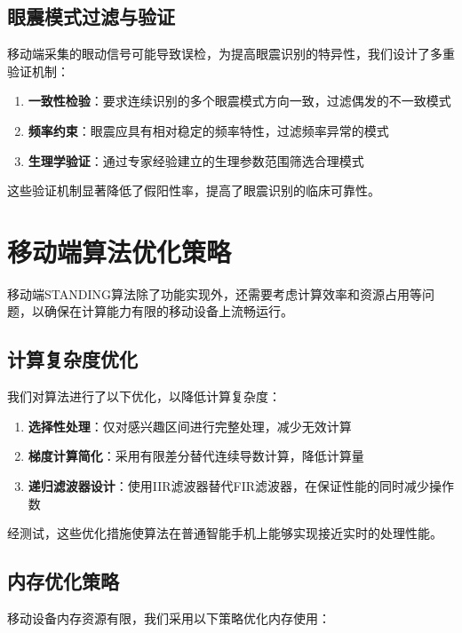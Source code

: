 \subsection{眼震模式过滤与验证}

移动端采集的眼动信号可能导致误检，为提高眼震识别的特异性，我们设计了多重验证机制：

\begin{enumerate}
  \item \textbf{一致性检验}：要求连续识别的多个眼震模式方向一致，过滤偶发的不一致模式
  \item \textbf{频率约束}：眼震应具有相对稳定的频率特性，过滤频率异常的模式
  \item \textbf{生理学验证}：通过专家经验建立的生理参数范围筛选合理模式
\end{enumerate}

这些验证机制显著降低了假阳性率，提高了眼震识别的临床可靠性。

\section{移动端算法优化策略}

移动端STANDING算法除了功能实现外，还需要考虑计算效率和资源占用等问题，以确保在计算能力有限的移动设备上流畅运行。

\subsection{计算复杂度优化}

我们对算法进行了以下优化，以降低计算复杂度：

\begin{enumerate}
  \item \textbf{选择性处理}：仅对感兴趣区间进行完整处理，减少无效计算
  \item \textbf{梯度计算简化}：采用有限差分替代连续导数计算，降低计算量
  \item \textbf{递归滤波器设计}：使用IIR滤波器替代FIR滤波器，在保证性能的同时减少操作数
\end{enumerate}

经测试，这些优化措施使算法在普通智能手机上能够实现接近实时的处理性能。

\subsection{内存优化策略}

移动设备内存资源有限，我们采用以下策略优化内存使用：

